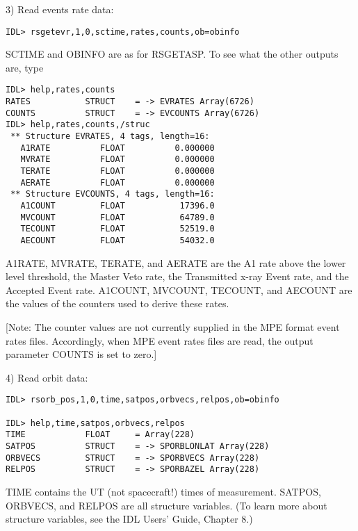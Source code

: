 3) Read events rate data:

\medskip\noindent
\begin{verbatim}
IDL> rsgetevr,1,0,sctime,rates,counts,ob=obinfo	
\end{verbatim}
SCTIME and OBINFO are as for RSGETASP. To see what the other outputs are, type

\medskip\noindent
\begin{verbatim}
IDL> help,rates,counts
RATES           STRUCT    = -> EVRATES Array(6726)
COUNTS          STRUCT    = -> EVCOUNTS Array(6726)
IDL> help,rates,counts,/struc
 ** Structure EVRATES, 4 tags, length=16:
   A1RATE          FLOAT          0.000000
   MVRATE          FLOAT          0.000000
   TERATE          FLOAT          0.000000
   AERATE          FLOAT          0.000000
 ** Structure EVCOUNTS, 4 tags, length=16:
   A1COUNT         FLOAT           17396.0
   MVCOUNT         FLOAT           64789.0
   TECOUNT         FLOAT           52519.0
   AECOUNT         FLOAT           54032.0
\end{verbatim}
A1RATE, MVRATE, TERATE, and AERATE are the A1 rate above the lower level
threshold, the Master Veto rate, the Transmitted x-ray Event rate, and the
Accepted Event rate. A1COUNT, MVCOUNT, TECOUNT, and AECOUNT are the values of
the counters used to derive these rates.
 
[Note: The counter values are not currently supplied in the MPE format
event rates files. Accordingly, when MPE event rates files are read, the
output parameter COUNTS is set to zero.]
 
4) Read orbit data:

\medskip\noindent
\begin{verbatim}
IDL> rsorb_pos,1,0,time,satpos,orbvecs,relpos,ob=obinfo 	
 
IDL> help,time,satpos,orbvecs,relpos
TIME            FLOAT     = Array(228)
SATPOS          STRUCT    = -> SPORBLONLAT Array(228)
ORBVECS         STRUCT    = -> SPORBVECS Array(228)
RELPOS          STRUCT    = -> SPORBAZEL Array(228)
\end{verbatim}
TIME contains the UT (not spacecraft!) times of measurement. SATPOS, ORBVECS,
and RELPOS are all structure variables. (To learn more about structure
variables, see the IDL Users' Guide, Chapter 8.)

